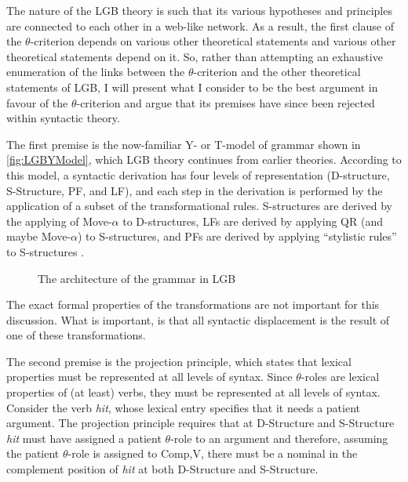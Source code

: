 \documentclass[MilwayThesis]{subfiles}
\begin{document}
The nature of the LGB theory is such that its various hypotheses and principles are connected to each other in a web-like network.
As a result, the first clause of the $\theta$-criterion depends on various other theoretical statements and various other theoretical statements depend on it.
So, rather than attempting an exhaustive enumeration of the links between the $\theta$-criterion and the other theoretical statements of LGB, I will present what I consider to be the best argument in favour of the $\theta$-criterion and argue that its premises have since been rejected within syntactic theory.

The first premise is the now-familiar Y- or T-model of grammar shown in \autoref{fig:LGBYModel}, which LGB theory continues from earlier theories.
According to this model, a syntactic derivation has four levels of representation (D-structure, S-Structure, PF, and LF), and each step in the derivation is performed by the application of a subset of the transformational rules.
S-structures are derived by the applying of Move-$\alpha$ to D-structures, LFs are derived by applying QR (and maybe Move-$\alpha$) to S-structures, and PFs are derived by applying ``stylistic rules'' to S-structures \parencite[18]{chomsky1981lectures}.
\begin{figure}[h]
	\centering
{}
	\caption{The architecture of the grammar in LGB}
	\label{fig:LGBYModel}
\end{figure}
The exact formal properties of the transformations are not important for this discussion.
What is important, is that all syntactic displacement is the result of one of these transformations.

The second premise is the projection principle, which states that lexical properties must be represented at all levels of syntax.
Since $\theta$-roles are lexical properties of (at least) verbs, they must be represented at all levels of syntax.
Consider the verb \textit{hit}, whose lexical entry specifies that it needs a patient argument.
The projection principle requires that at D-Structure and S-Structure \textit{hit} must have assigned a patient $\theta$-role to an argument and therefore, assuming the patient $\theta$-role is assigned to Comp,V, there must be a nominal in the complement position of \textit{hit} at both D-Structure and S-Structure.
\end{document}
